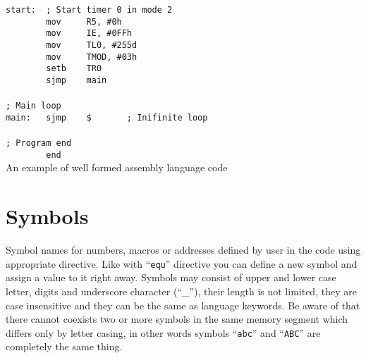 \documentclass[a4paper,twoside,12pt]{book}
\newcommand{\mysmallfont}{\fontsize{8pt}{10pt} \selectfont{}}
\begin{document}
		\begin{code}[h!]
			\mysmallfont{}
			{\color{highlight_label}\verb'start:'}\verb'  '{\color{highlight_comment}\verb'; Start timer 0 in mode 2'}\\
			\verb'        '{\color{highlight_instruction}\verb'mov'}\verb'     '{\color{highlight_sfr}\verb'R5'}{\color{highlight_oper_sep}\verb','}\verb' '{\color{highlight_imm_hex}\verb'#0h'}\\
			\verb'        '{\color{highlight_instruction}\verb'mov'}\verb'     '{\color{highlight_sfr}\verb'IE'}{\color{highlight_oper_sep}\verb','}\verb' '{\color{highlight_imm_hex}\verb'#0FFh'}\\
			\verb'        '{\color{highlight_instruction}\verb'mov'}\verb'     '{\color{highlight_sfr}\verb'TL0'}{\color{highlight_oper_sep}\verb','}\verb' '{\color{highlight_imm_dec}\verb'#255d'}\\
			\verb'        '{\color{highlight_instruction}\verb'mov'}\verb'     '{\color{highlight_sfr}\verb'TMOD'}{\color{highlight_oper_sep}\verb','}\verb' '{\color{highlight_imm_hex}\verb'#03h'}\\
			\verb'        '{\color{highlight_instruction}\verb'setb'}\verb'    '{\color{highlight_sfr}\verb'TR0'}\\
			\verb'        '{\color{highlight_instruction}\verb'sjmp'}\verb'    '{\color{highlight_constant}\verb'main'}\\
			\verb''\\
			{\color{highlight_comment}\verb'; Main loop'}\\
			{\color{highlight_label}\verb'main:'}\verb'   '{\color{highlight_instruction}\verb'sjmp'}\verb'    '{\color{highlight_constant}\verb'$'}\verb'       '{\color{highlight_comment}\verb'; Inifinite loop'}\\
			\verb''\\
			{\color{highlight_comment}\verb'; Program end'}\\
			\verb'        '{\color{highlight_directive}\verb'end'}\\

			\caption{An example of well formed assembly language code}
		\end{code}

	\section{Symbols}
		Symbol names for numbers, macros or addresses defined by user in the code using 
    appropriate directive. Like with ``\texttt{equ}'' directive you can define a new 
    symbol and assign a value to it right away. Symbols may consist of upper and lower
     case letter, digits and underscore character (``\_''), their length is not limited,
      they are case insensitive and they can be the same as language keywords. Be aware of
       that there cannot coexists two or more symbols in the same memory segment which differs 
       only by letter casing, in other words symbols ``\texttt{abc}'' and ``\texttt{ABC}'' 
       are completely the same thing.
\end{document}
